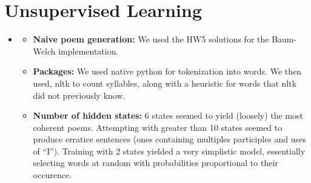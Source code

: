 
\pagebreak

\section{Unsupervised Learning}
\medskip
\begin{itemize}

    \item {}

    \begin{itemize}
    \item \textbf{Naive poem generation:}
        We used the HW5 solutions for the Baum-Welch implementation.
    \item \textbf{Packages:}
        We used native python for tokenization into words. We then used, nltk
        to count syllables, along with a heuristic for words that nltk did not
        previously know.
    \item \textbf{Number of hidden states:}
        6 states seemed to yield (loosely) the most coherent poems. Attempting
        with greater than 10 states seemed to produce erratice sentences (ones
        containing multiples participles and uses of ``I''). Training with
        2 states yielded a very simplistic model, essentially selecting words
        at random with probabilities proportional to their occurence.
    \end{itemize}


\end{itemize}


\pagebreak
